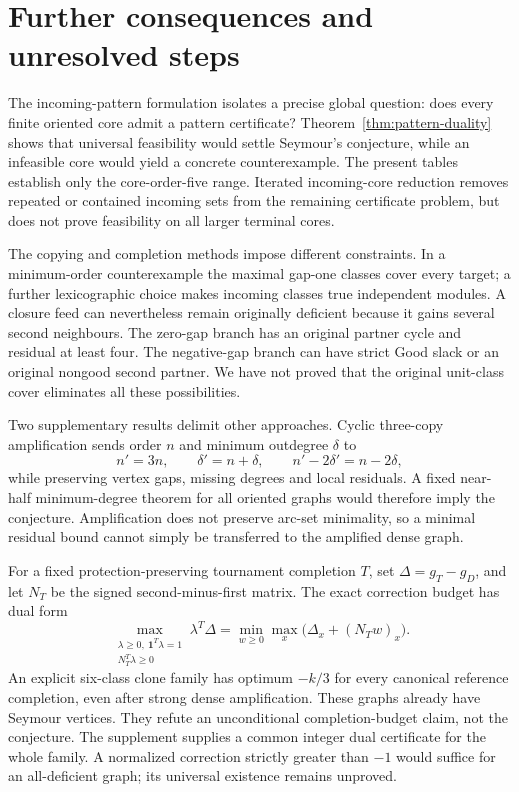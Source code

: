 \section{Further consequences and unresolved steps}\label{sec:paper-discussion}
The incoming-pattern formulation isolates a precise global question: does
every finite oriented core admit a pattern certificate? Theorem~\ref{thm:pattern-duality}
shows that universal feasibility would settle Seymour's conjecture, while
an infeasible core would yield a concrete counterexample. The present tables
establish only the core-order-five range. Iterated incoming-core reduction
removes repeated or contained incoming sets from the remaining certificate
problem, but does not prove feasibility on all larger terminal cores.

The copying and completion methods impose different constraints. In a
minimum-order counterexample the maximal gap-one classes cover every target;
a further lexicographic choice makes incoming classes true independent
modules. A closure feed can nevertheless remain originally deficient because
it gains several second neighbours. The zero-gap branch has an original
partner cycle and residual at least four. The negative-gap branch can have
strict Good slack or an original nongood second partner. We have not proved
that the original unit-class cover eliminates all these possibilities.

Two supplementary results delimit other approaches. Cyclic three-copy
amplification sends order $n$ and minimum outdegree $\delta$ to
\[
 n'=3n,\qquad\delta'=n+\delta,\qquad n'-2\delta'=n-2\delta,
\]
while preserving vertex gaps, missing degrees and local residuals.
A fixed near-half minimum-degree theorem for all oriented graphs would
therefore imply the conjecture. Amplification does not preserve arc-set
minimality, so a minimal residual bound cannot simply be transferred to
the amplified dense graph.

For a fixed protection-preserving tournament completion $T$, set
$\Delta=g_T-g_D$, and let $N_T$ be the signed second-minus-first matrix.
The exact correction budget has dual form
\[
 \max_{\substack{\lambda\ge0,\ \mathbf1^T\lambda=1\\N_T^T\lambda\ge0}}
       \lambda^T\Delta
   =\min_{w\ge0}\max_x\bigl(\Delta_x+(N_Tw)_x\bigr).
\]
An explicit six-class clone family has optimum $-k/3$ for every canonical
reference completion, even after strong dense amplification. These graphs
already have Seymour vertices. They refute an unconditional completion-budget
claim, not the conjecture. The supplement supplies a common integer dual
certificate for the whole family. A normalized correction strictly greater
than $-1$ would suffice for an all-deficient graph; its universal existence
remains unproved.

